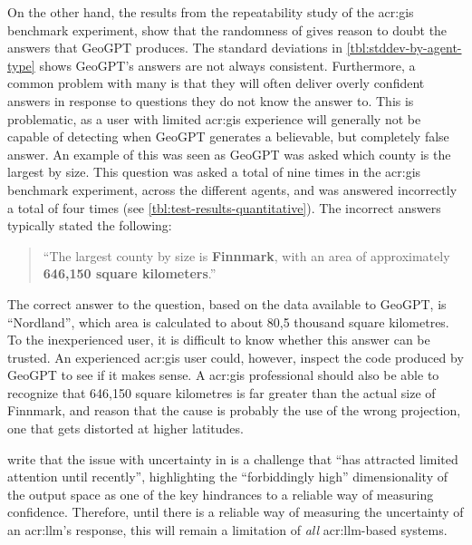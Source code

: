 On the other hand, the results from the repeatability study of the \acrshort{acr:gis} benchmark experiment, show that the randomness of  gives reason to doubt the answers that GeoGPT produces. The standard deviations in \autoref{tbl:stddev-by-agent-type} shows GeoGPT's answers are not always consistent. Furthermore, a common problem with many  is that they will often deliver overly confident answers in response to questions they do not know the answer to. This is problematic, as a user with limited \acrshort{acr:gis} experience will generally not be capable of detecting when GeoGPT generates a believable, but completely false answer. An example of this was seen as GeoGPT was asked which county is the largest by size. This question was asked a total of nine times in the \acrshort{acr:gis} benchmark experiment, across the different agents, and was answered incorrectly a total of four times (see \autoref{tbl:test-results-quantitative}). The incorrect answers typically stated the following:

\begin{quote}
    \enquote{The largest county by size is \textbf{Finnmark}, with an area of approximately \textbf{646,150 square kilometers}.}
\end{quote}

The correct answer to the question, based on the data available to GeoGPT, is \enquote{Nordland}, which area is calculated to about 80,5 thousand square kilometres. To the inexperienced user, it is difficult to know whether this answer can be trusted. An experienced \acrshort{acr:gis} user could, however, inspect the code produced by GeoGPT to see if it makes sense. A \acrshort{acr:gis} professional should also be able to recognize that 646,150 square kilometres is far greater than the actual size of Finnmark, and reason that the cause is probably the use of the wrong projection, one that gets distorted at higher latitudes.

\cite[1-2]{linGeneratingConfidenceUncertainty2023} write that the issue with uncertainty in  is a challenge that \enquote{has attracted limited attention until recently}, highlighting the \enquote{forbiddingly high} dimensionality of the output space as one of the key hindrances to a reliable way of measuring confidence. Therefore, until there is a reliable way of measuring the uncertainty of an \acrshort{acr:llm}'s response, this will remain a limitation of \textit{all} \acrshort{acr:llm}-based systems.

